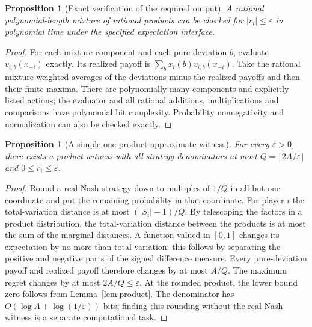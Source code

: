 \documentclass[11pt,a4paper]{article}
\newtheorem{proposition}[theorem]{Proposition}
\theoremstyle{definition}\newtheorem{definition}[theorem]{Definition}
\theoremstyle{remark}\newtheorem{remark}[theorem]{Remark}
\newcommand{\1}{\mathbf 1}
\begin{document}
\begin{proposition}[Exact verification of the required output]\label{prop:verify}
A rational polynomial-length mixture of rational products can be checked for $|r_i|\le\varepsilon$ in polynomial time under the specified expectation interface.
\end{proposition}
\begin{proof}
For each mixture component and each pure deviation $b$, evaluate $v_{i,b}(x_{-i})$ exactly. Its realized payoff is $\sum_bx_i(b)v_{i,b}(x_{-i})$. Take the rational mixture-weighted averages of the deviations minus the realized payoffs and then their finite maxima. There are polynomially many components and explicitly listed actions; the evaluator and all rational additions, multiplications and comparisons have polynomial bit complexity. Probability nonnegativity and normalization can also be checked exactly.
\end{proof}

\begin{proposition}[A simple one-product approximate witness]
For every $\varepsilon>0$, there exists a product witness with all strategy denominators at most $Q=\lceil2A/\varepsilon\rceil$ and $0\le r_i\le\varepsilon$.
\end{proposition}
\begin{proof}
Round a real Nash strategy down to multiples of $1/Q$ in all but one coordinate and put the remaining probability in that coordinate. For player $i$ the total-variation distance is at most $(|S_i|-1)/Q$. By telescoping the factors in a product distribution, the total-variation distance between the products is at most the sum of the marginal distances. A function valued in $[0,1]$ changes its expectation by no more than total variation: this follows by separating the positive and negative parts of the signed difference measure. Every pure-deviation payoff and realized payoff therefore changes by at most $A/Q$. The maximum regret changes by at most $2A/Q\le\varepsilon$. At the rounded product, the lower bound zero follows from Lemma~\ref{lem:product}. The denominator has $O(\log A+\log(1/\varepsilon))$ bits; finding this rounding without the real Nash witness is a separate computational task.
\end{proof}
\end{document}
